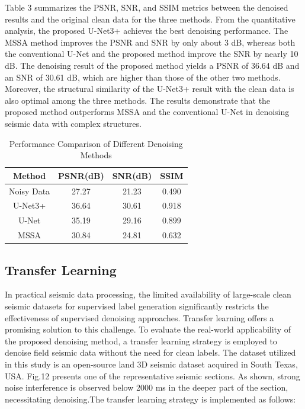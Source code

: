 \documentclass[preprint,12pt]{elsarticle}
\begin{document}
Table 3 summarizes the PSNR, SNR, and SSIM metrics between the denoised results and the original clean data for the three methods. From the quantitative analysis, the proposed U-Net3+ achieves the best denoising performance. The MSSA method improves the PSNR and SNR by only about 3 dB, whereas both the conventional U-Net and the proposed method improve the SNR by nearly 10 dB. The denoising result of the proposed method yields a PSNR of 36.64 dB and an SNR of 30.61 dB, which are higher than those of the other two methods. Moreover, the structural similarity of the U-Net3+ result with the clean data is also optimal among the three methods. The results demonstrate that the proposed method outperforms MSSA and the conventional U-Net in denoising seismic data with complex structures.

\begin{table}[t]
\centering
\caption{Performance Comparison of Different Denoising Methods}
\begin{tabular}{cccc}
\toprule
Method & PSNR(dB) & SNR(dB) & SSIM \\
\midrule
Noisy Data & 27.27 & 21.23 & 0.490 \\
U-Net3+ & 36.64 & 30.61 & 0.918 \\
U-Net & 35.19 & 29.16 & 0.899 \\
MSSA & 30.84 & 24.81 & 0.632 \\
\bottomrule
\end{tabular}
\label{Table 3}
\end{table}


\subsection{Transfer Learning}
In practical seismic data processing, the limited availability of large-scale clean seismic datasets for supervised label generation significantly restricts the effectiveness of supervised denoising approaches. Transfer learning offers a promising solution to this challenge. To evaluate the real-world applicability of the proposed denoising method, a transfer learning strategy is employed to denoise field seismic data without the need for clean labels. The dataset utilized in this study is an open-source land 3D seismic dataset acquired in South Texas, USA. Fig.12 presents one of the representative seismic sections. As shown, strong noise interference is observed below 2000 ms in the deeper part of the section, necessitating denoising.The transfer learning strategy is implemented as follows:
\end{document}
